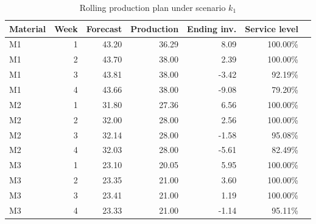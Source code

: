 \begin{table}[H]
\centering
\caption{Rolling production plan under scenario $k_1$}
\label{tab:demo-v1-production-plan}
\begin{tabular}{lrrrrrr}
\toprule
Material & Week & Forecast & Production & Ending inv. & Service level \\
\midrule
M1 & 1 & 43.20 & 36.29 & 8.09 & 100.00\% \\
M1 & 2 & 43.70 & 38.00 & 2.39 & 100.00\% \\
M1 & 3 & 43.81 & 38.00 & -3.42 & 92.19\% \\
M1 & 4 & 43.66 & 38.00 & -9.08 & 79.20\% \\
M2 & 1 & 31.80 & 27.36 & 6.56 & 100.00\% \\
M2 & 2 & 32.00 & 28.00 & 2.56 & 100.00\% \\
M2 & 3 & 32.14 & 28.00 & -1.58 & 95.08\% \\
M2 & 4 & 32.03 & 28.00 & -5.61 & 82.49\% \\
M3 & 1 & 23.10 & 20.05 & 5.95 & 100.00\% \\
M3 & 2 & 23.35 & 21.00 & 3.60 & 100.00\% \\
M3 & 3 & 23.41 & 21.00 & 1.19 & 100.00\% \\
M3 & 4 & 23.33 & 21.00 & -1.14 & 95.11\% \\
\bottomrule
\end{tabular}
\end{table}
